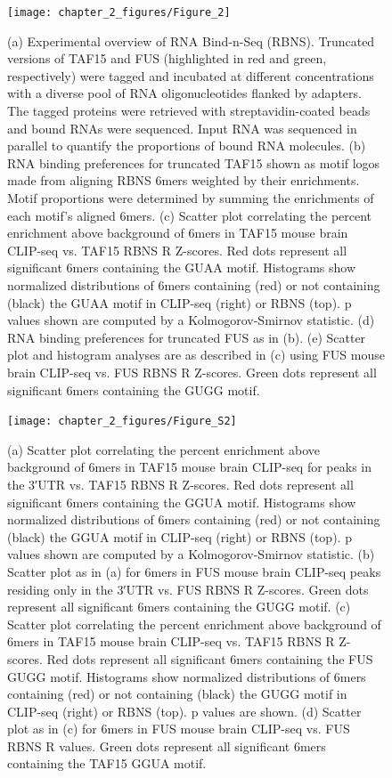\begin{figure}[ht]
  \centering
  \texttt{[image: chapter\_2\_figures/Figure\_2]}
  \caption[Figure 2. RNA Bind-n-Seq confirms enrichment for GGUA motifs in RNAs that bind TAF15 in vitro.]{(a) Experimental overview of RNA Bind-n-Seq (RBNS). Truncated versions of TAF15 and FUS (highlighted in red and green, respectively) were tagged and incubated at different concentrations with a diverse pool of RNA oligonucleotides flanked by adapters. The tagged proteins were retrieved with streptavidin-coated beads and bound RNAs were sequenced. Input RNA was sequenced in parallel to quantify the proportions of bound RNA molecules. (b) RNA binding preferences for truncated TAF15 shown as motif logos made from aligning RBNS 6mers weighted by their enrichments. Motif proportions were determined by summing the enrichments of each motif’s aligned 6mers. (c) Scatter plot correlating the percent enrichment above background of 6mers in TAF15 mouse brain CLIP-seq vs. TAF15 RBNS R Z-scores. Red dots represent all significant 6mers containing the GUAA motif. Histograms show normalized distributions of 6mers containing (red) or not containing (black) the GUAA motif in CLIP-seq (right) or RBNS (top). p values shown are computed by a Kolmogorov-Smirnov statistic. (d) RNA binding preferences for truncated FUS as in (b). (e) Scatter plot and histogram analyses are as described in (c) using FUS mouse brain CLIP-seq vs. FUS RBNS R Z-scores. Green dots represent all significant 6mers containing the GUGG motif.}
  \label{fig:Figure_2}
\end{figure}

\begin{figure}[ht]
  \centering
  \texttt{[image: chapter\_2\_figures/Figure\_S2]}
  \caption[Supplementary Figure 2. RNA Bind-n-Seq confirms enrichment for GGUA motifs in RNAs that bind TAF15 in vitro.]{(a) Scatter plot correlating the percent enrichment above background of 6mers in TAF15 mouse brain CLIP-seq for peaks in the 3′UTR vs. TAF15 RBNS R Z-scores. Red dots represent all significant 6mers containing the GGUA motif. Histograms show normalized distributions of 6mers containing (red) or not containing (black) the GGUA motif in CLIP-seq (right) or RBNS (top). p values shown are computed by a Kolmogorov-Smirnov statistic. (b) Scatter plot as in (a) for 6mers in FUS mouse brain CLIP-seq peaks residing only in the 3′UTR vs. FUS RBNS R Z-scores. Green dots represent all significant 6mers containing the GUGG motif. (c) Scatter plot correlating the percent enrichment above background of 6mers in TAF15 mouse brain CLIP-seq vs. TAF15 RBNS R Z-scores. Red dots represent all significant 6mers containing the FUS GUGG motif. Histograms show normalized distributions of 6mers containing (red) or not containing (black) the GUGG motif in CLIP-seq (right) or RBNS (top). p values are shown. (d) Scatter plot as in (c) for 6mers in FUS mouse brain CLIP-seq vs. FUS RBNS R values. Green dots represent all significant 6mers containing the TAF15 GGUA motif.}
  \label{fig:Figure_S2}
\end{figure}


